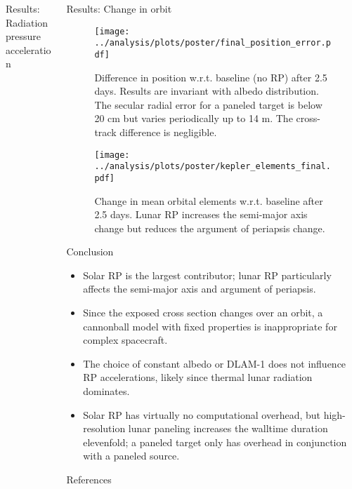 \documentclass[final,20pt]{beamer}
\begin{document}
\begin{frame}[t]
\begin{columns}[t]
\begin{column}{\colwidth}
\begin{block}{Results: Radiation pressure acceleration}
  \end{block}

  


\end{column}

\separatorcolumn

\begin{column}{\colwidth}

  \begin{alertblock}{Results: Change in orbit}

    \begin{figure}[h]
      \centering
      \texttt{[image: ../analysis/plots/poster/final\_position\_error.pdf]}
      \caption{Difference in position w.r.t. baseline (no RP) after 2.5 days. Results are invariant with albedo distribution. The secular radial error for a paneled target is below 20 cm but varies periodically up to 14 m. The cross-track difference is negligible. }
      \label{fig:error}
    \end{figure}
    \begin{figure}[h]
      \centering
      \texttt{[image: ../analysis/plots/poster/kepler\_elements\_final.pdf]}
      \caption{Change in mean orbital elements w.r.t. baseline after 2.5 days. Lunar RP increases the semi-major axis change but reduces the argument of periapsis change.}
      \label{fig:kepler}
    \end{figure}

  \end{alertblock}

  \begin{block}{Conclusion}

    \begin{itemize}
      \item Solar RP is the largest contributor; lunar RP particularly affects the semi-major axis and argument of periapsis.
      \item Since the exposed cross section changes over an orbit, a cannonball model with fixed properties is inappropriate for complex spacecraft.
      \item The choice of constant albedo or DLAM-1 does not influence RP accelerations, likely since thermal lunar radiation dominates.
      \item Solar RP has virtually no computational overhead, but high-resolution lunar paneling increases the walltime duration elevenfold; a paneled target only has overhead in conjunction with a paneled source.
    \end{itemize}


  \end{block}
  

  \begin{block}{References}

    \footnotesize{\printbibliography}

  \end{block}

\end{column}

\separatorcolumn
\end{columns}
\end{frame}
\end{document}
